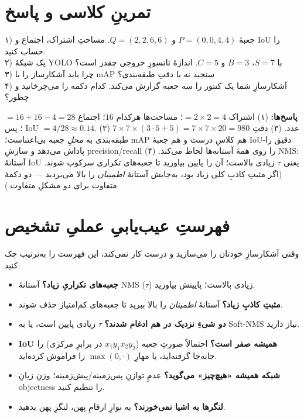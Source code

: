 \documentclass[12pt,a4paper]{article}
\begin{document}
\section{تمرینِ کلاسی و پاسخ}

\begin{tamrin}
۱) جعبهٔ $P=(0,0,4,4)$ و $Q=(2,2,6,6)$. مساحتِ اشتراک، اجتماع و IoU را حساب کنید.\\
۲) یک شبکهٔ YOLO با $S=7$، $B=3$ و $C=5$. اندازهٔ تانسورِ خروجی چقدر است؟\\
۳) چرا باید آشکارساز را با mAP سنجید نه با دقتِ طبقه‌بندی؟\\
۴) آشکارسازِ شما یک کنتور را سه جعبه گزارش می‌کند. کدام دکمه را می‌چرخانید و چطور؟
\end{tamrin}

\textbf{پاسخ‌ها:} (۱) اشتراک $=2\times2=4$؛ مساحت‌ها هرکدام $16$؛ اجتماع $=16+16-4=28$؛ پس IoU $=4/28\approx0.14$. (۲) $7\times7\times(3\cdot5+5)=7\times7\times20=980$ عدد. (۳) دقتِ طبقه‌بندی به \emph{محلِ} جعبه بی‌اعتناست؛ mAP هم کلاسِ درست و هم جعبهٔ IoU-دقیق را پاداش می‌دهد و سازشِ precision/recall را روی همهٔ آستانه‌ها لحاظ می‌کند. (۴) NMS: آستانهٔ IoU یعنی $\tau$ زیادی بالاست؛ آن را پایین بیاورید تا جعبه‌های تکراری سرکوب شوند. (اگر مثبتِ کاذبِ کلی زیاد بود، به‌جایش آستانهٔ \emph{اطمینان} را بالا می‌بردید — دو دکمهٔ متفاوت برای دو مشکلِ متفاوت.)

\section{فهرستِ عیب‌یابیِ عملیِ تشخیص}

وقتی آشکارسازِ خودتان را می‌سازید و درست کار نمی‌کند، این فهرست را به‌ترتیب چک کنید:

\begin{itemize}
  \item \textbf{جعبه‌های تکراریِ زیاد؟} آستانهٔ NMS ($\tau$) زیادی بالاست؛ پایینش بیاورید.
  \item \textbf{مثبتِ کاذبِ زیاد؟} آستانهٔ \emph{اطمینان} را بالا ببرید تا جعبه‌های کم‌امتیاز حذف شوند.
  \item \textbf{دو شیءِ نزدیک در هم ادغام شدند؟} $\tau$ زیادی پایین است، یا به Soft-NMS نیاز دارید.
  \item \textbf{IoU همیشه صفر است؟} احتمالاً صورتِ جعبه ($x_1y_1x_2y_2$ در برابرِ مرکزی) را جابه‌جا گرفته‌اید، یا مهارِ $\max(0,\cdot)$ را فراموش کرده‌اید.
  \item \textbf{شبکه همیشه «هیچ‌چیز» می‌گوید؟} عدمِ توازنِ پس‌زمینه/پیش‌زمینه؛ وزنِ زیانِ objectness را تنظیم کنید.
  \item \textbf{لنگرها به اشیا نمی‌خورند؟} به نوارِ ارقامِ پهن، لنگرِ پهن بدهید.
\end{itemize}
\end{document}
